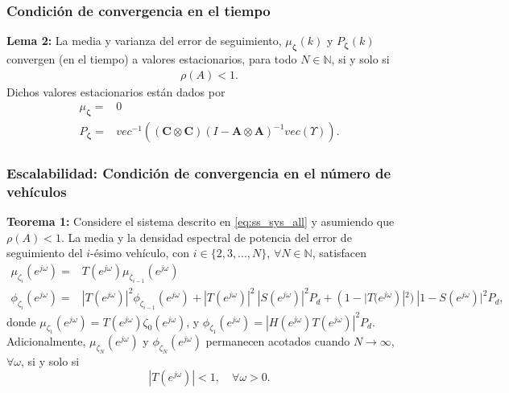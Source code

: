\documentclass[aspectratio=169,dvipsnames]{beamer}
\newcommand\norm[1]{\left\lVert#1\right\rVert}
\begin{document}
\begin{frame}{}
\frametitle{Condición de convergencia en el tiempo}
\vspace{3mm}
\begin{mybox}{}
    {\bf Lema 2:} La media y varianza del error de seguimiento, $\mu_{\bm{\zeta}}(k)$ y $P_{\bm{\zeta}}(k)$ convergen (en el tiempo) a valores estacionarios, para todo $N \in \mathbb{N}$, si y solo si
    \begin{align}
        \label{eq:MSS_all}
        \rho (A)<1.
    \end{align}
   Dichos valores estacionarios están dados por
   \begin{subequations} \label{eq:stationary_all}
       \begin{align}
           \mu_{\bm{\zeta}} =& 0 \\
           P_{\bm{\zeta}} =& vec^{-1} \left( (\mathbf{C} \otimes \mathbf{C})  (I- \mathbf{A} \otimes \mathbf{A} )^{-1} vec(\Upsilon)  \right).
       \end{align}
   \end{subequations}
\end{mybox}
\end{frame}

\begin{frame}{}
\frametitle{Escalabilidad: Condición de convergencia en el número de vehículos}
\vspace{3mm}
\begin{mybox}{}
    {\bf Teorema 1:} Considere el sistema descrito en \eqref{eq:ss_sys_all} y asumiendo que $\rho(A) < 1$. La media y la densidad espectral de potencia del error de seguimiento del $i$-ésimo vehículo, con $i \in \lbrace 2,3,...,N\rbrace$, $\forall N \in \mathbb{N}$, satisfacen
    \begin{align}
    \label{eq:zdom_muz_all}
    \mu_{\zeta_{i}}(e^{j\omega}) =& T(e^{j\omega}) \mu_{\zeta_{i-1}} (e^{j\omega}) \\
     \label{eq:zdom_psdz_all}
    \phi_{\zeta_i}(e^{j\omega}) =&
        |T(e^{j\omega})|^2 \phi_{\zeta_{i-1}} (e^{j\omega}) + |T(e^{j\omega})|^2 \ |S(e^{j\omega})|^2 P_d + \left( 1-|T(e^{j\omega} \right)|^2)\ |1-S(e^{j\omega})|^2  P_d,
    \end{align}
    donde $\mu_{\zeta_{1}}(e^{j\omega}) = T(e^{j\omega}) \zeta_{0} (e^{j\omega})$, y $\phi_{\zeta_1}(e^{j\omega})=|H(e^{j\omega})T(e^{j\omega})|^2 P_d$.
    Adicionalmente, $\mu_{\zeta_{N}}(e^{j\omega})$ y $\phi_{\zeta_N}(e^{j\omega})$ permanecen acotados cuando $N \rightarrow \infty$, $\forall \omega$, si y solo si 
        \begin{equation} \label{eq:scalability_all}
    |T(e^{j\omega})| <1, \quad \forall \omega >0.
\end{equation}
\end{mybox}
\end{frame}
\end{document}
